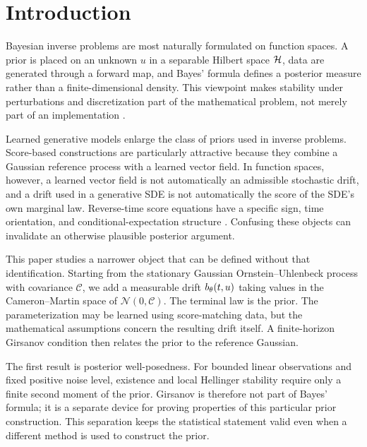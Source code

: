 \section{Introduction}
\label{sec:intro}

Bayesian inverse problems are most naturally formulated on function
spaces.  A prior is placed on an unknown $u$ in a separable Hilbert
space $\mathcal{H}$, data are generated through a forward map, and Bayes'
formula defines a posterior measure rather than a finite-dimensional
density.  This viewpoint makes stability under perturbations and
discretization part of the mathematical problem, not merely part of an
implementation \citep{stuart2010,dashti2017}.

Learned generative models enlarge the class of priors used in inverse
problems.  Score-based constructions are particularly attractive
because they combine a Gaussian reference process with a learned
vector field.  In function spaces, however, a learned vector field is
not automatically an admissible stochastic drift, and a drift used in
a generative SDE is not automatically the score of the SDE's own
marginal law.  Reverse-time score equations have a specific sign,
time orientation, and conditional-expectation structure
\citep{pidstrigach2023}.  Confusing these objects can invalidate an
otherwise plausible posterior argument.

This paper studies a narrower object that can be defined without that
identification.  Starting from the stationary Gaussian
Ornstein--Uhlenbeck process with covariance $\mathcal C$, we add a
measurable drift ${b_{\theta}}(t,u)$ taking values in the Cameron--Martin
space of $\mathcal N(0,\mathcal C)$.  The terminal law is the prior.
The parameterization may be learned using score-matching data, but the
mathematical assumptions concern the resulting drift itself.  A
finite-horizon Girsanov condition then relates the prior to the
reference Gaussian.

The first result is posterior well-posedness.  For bounded linear
observations and fixed positive noise level, existence and local
Hellinger stability require only a finite second moment of the prior.
Girsanov is therefore not part of Bayes' formula; it is a separate
device for proving properties of this particular prior construction.
This separation keeps the statistical statement valid even when a
different method is used to construct the prior.

